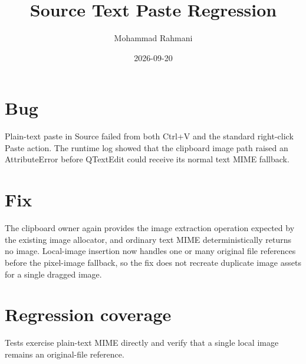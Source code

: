 \documentclass[a4paper]{article}
\title{Source Text Paste Regression}
\date{2026-09-20}
\author{Mohammad Rahmani}
\begin{document}
   \maketitle

   \begin{preview}
      \section{Bug}
      Plain-text paste in Source failed from both Ctrl+V and the standard
      right-click Paste action. The runtime log showed that the clipboard image
      path raised an AttributeError before QTextEdit could receive its normal
      text MIME fallback.

      \section{Fix}
      The clipboard owner again provides the image extraction operation expected
      by the existing image allocator, and ordinary text MIME deterministically
      returns no image. Local-image insertion now handles one or many original
      file references before the pixel-image fallback, so the fix does not
      recreate duplicate image assets for a single dragged image.

      \section{Regression coverage}
      Tests exercise plain-text MIME directly and verify that a single local
      image remains an original-file reference.
   \end{preview}

   
   
\end{document}
